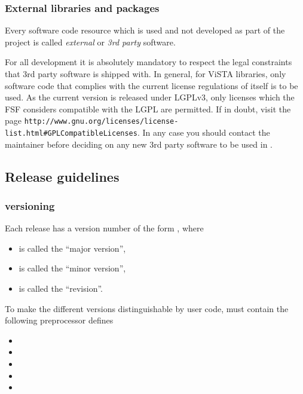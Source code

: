\subsubsection{External libraries and packages}
Every software code resource which is used and not developed as part of the  project is called \emph{external} or \emph{3rd party} software.

For all  development it is absolutely mandatory to respect the legal constraints that 3rd party software is shipped with.
In general, for ViSTA libraries, only software code that complies with the current license regulations of  itself is to be used.
As the current  version is released under LGPLv3, only licenses which the FSF considers compatible with the LGPL are permitted.
If in doubt, visit the page \texttt{http://www.gnu.org/licenses/license-list.html\#GPLCompatibleLicenses}. 
In any case you should contact the  maintainer before deciding on any new 3rd party software to be used in .

\subsection{Release guidelines}

\subsubsection{ versioning}
Each  release has a version number of the form , where
\begin{itemize}
\item{} is called the ``major version'',
\item{} is called the ``minor version'',
\item{} is called the ``revision''.
\end{itemize}

To make the different versions distinguishable by user code,  must contain the following preprocessor defines
\begin{itemize}
\item{}
\item{}
\item{}
\item{}
\item{}
\end{itemize}



